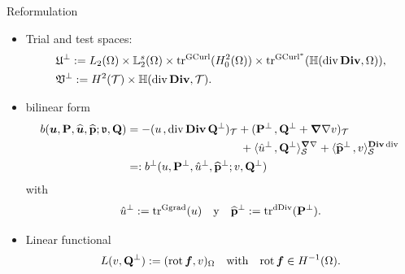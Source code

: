 \documentclass[10pt]{beamer}
\begin{document}
\begin{frame}{Reformulation }
\begin{itemize}
\item Trial and test spaces:
\begin{align*}
   &\UU^\perp:=L_2(\Omega)\times\LL_2^s(\Omega)\times 
   \tracegc{}(H^2_0(\Omega))\times \tra{}(\HdDiv{\Omega}) , \\ %
   &\VV^\perp:=H^2(\cT)\times\HdDiv{\cT}. %
\end{align*}
\item bilinear form
\begin{align*} \label{b_Stokes}
   b(\bu,\PP,\tbu,\tPP;\vv,\QQ) %
   &=
   -\vdual{u}{\div\Div\QQ^\perp}_\cT + \vdual{\PP^\perp}{\QQ^\perp+\Grad\grad v}_\cT \nonumber \\
   & \hspace{10em} + \dualgg{\tu^\perp}{\QQ^\perp}_\cS + \dualdd{\tPP^\perp}{v}_\cS\nonumber\\
   &=: b^\perp(u,\PP^\perp,\tu^\perp,\tPP^\perp;v,\QQ^\perp) 
\end{align*}
with 
\[
   {\hat u}^\perp:=\mathrm{tr}_{}^{\mathrm{Ggrad}}(u) \quad\text{y}\quad \widehat{\mathbf{p}}^\perp:=\mathrm{tr}_{}^{\mathrm{dDiv}}(\mathbf{P}^\perp).
\]
\item Linear functional 
\begin{align*}
    L(v,\mathbf{Q}^\perp) := ({\rm rot\,} \boldsymbol{f},v)_\Omega \quad \text{with} \quad {\rm rot\,} \boldsymbol{f} \in H^{-1}(\Omega). 
\end{align*}
\end{itemize}
\end{frame}
\end{document}
